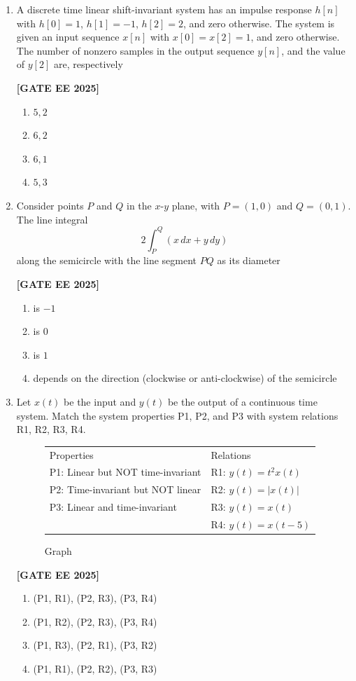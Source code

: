\documentclass[12pt]{article}
\begin{document}
\begin{enumerate}[leftmargin=*, label=\textbf{Q.\arabic*:}]
\item A discrete time linear shift-invariant system has an impulse response $h[n]$ with $h[0]=1$, $h[1]=-1$, $h[2]=2$, and zero otherwise. The system is given an input sequence $x[n]$ with $x[0]=x[2]=1$, and zero otherwise. The number of nonzero samples in the output sequence $y[n]$, and the value of $y[2]$ are, respectively
 
\noindent \textbf{[GATE EE 2025]}
\begin{enumerate}
    \item $5, 2$
    \item $6, 2$
    \item $6, 1$
    \item $5, 3$
\end{enumerate}

\item Consider points $P$ and $Q$ in the $x$-$y$ plane, with $P = (1,0)$ and $Q = (0,1)$. The line integral
\[
2\int_P^Q (x\,dx + y\,dy)
\]
along the semicircle with the line segment $PQ$ as its diameter
 
\noindent \textbf{[GATE EE 2025]}
\begin{enumerate}
  \item is $-1$
  \item is $0$
  \item is $1$
  \item depends on the direction (clockwise or anti-clockwise) of the semicircle
\end{enumerate}

\item Let $x(t)$ be the input and $y(t)$ be the output of a continuous time system. Match the system properties P1, P2, and P3 with system relations R1, R2, R3, R4.
\begin{figure}[H]\centering
  \begin{tabular}{ll}
    Properties & Relations \\
    P1: Linear but NOT time-invariant              & R1: $y(t)=t^2 x(t) $ \\
    P2: Time-invariant but NOT linear              & R2: $y(t)=|x(t)| $ \\
    P3: Linear and time-invariant                  & R3: $y(t)=x(t)$ \\
                                                  & R4: $y(t)=x(t-5)$
  \end{tabular}
\caption{Graph}
\label{fig:q11}
\end{figure}
 
\noindent \textbf{[GATE EE 2025]}
\begin{enumerate}
  \item (P1, R1), (P2, R3), (P3, R4)
  \item (P1, R2), (P2, R3), (P3, R4)
  \item (P1, R3), (P2, R1), (P3, R2)
  \item (P1, R1), (P2, R2), (P3, R3)
\end{enumerate}


\end{enumerate}
\end{document}
